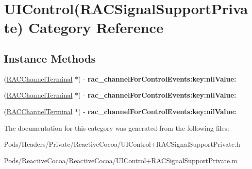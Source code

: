 \hypertarget{category_u_i_control_07_r_a_c_signal_support_private_08}{}\section{U\+I\+Control(R\+A\+C\+Signal\+Support\+Private) Category Reference}
\label{category_u_i_control_07_r_a_c_signal_support_private_08}
\subsection*{Instance Methods}
\begin{DoxyCompactItemize}
\item 
\mbox{\label{category_u_i_control_07_r_a_c_signal_support_private_08_a287d73439f15bf8e484ccc462cccd0b3}} 
(\mbox{\hyperlink{interface_r_a_c_channel_terminal}{R\+A\+C\+Channel\+Terminal}} $\ast$) -\/ {\bfseries rac\+\_\+channel\+For\+Control\+Events\+:key\+:nil\+Value\+:}
\item 
\mbox{\label{category_u_i_control_07_r_a_c_signal_support_private_08_a287d73439f15bf8e484ccc462cccd0b3}} 
(\mbox{\hyperlink{interface_r_a_c_channel_terminal}{R\+A\+C\+Channel\+Terminal}} $\ast$) -\/ {\bfseries rac\+\_\+channel\+For\+Control\+Events\+:key\+:nil\+Value\+:}
\item 
\mbox{\label{category_u_i_control_07_r_a_c_signal_support_private_08_a287d73439f15bf8e484ccc462cccd0b3}} 
(\mbox{\hyperlink{interface_r_a_c_channel_terminal}{R\+A\+C\+Channel\+Terminal}} $\ast$) -\/ {\bfseries rac\+\_\+channel\+For\+Control\+Events\+:key\+:nil\+Value\+:}
\end{DoxyCompactItemize}


The documentation for this category was generated from the following files\+:\begin{DoxyCompactItemize}
\item 
Pods/\+Headers/\+Private/\+Reactive\+Cocoa/U\+I\+Control+\+R\+A\+C\+Signal\+Support\+Private.\+h\item 
Pods/\+Reactive\+Cocoa/\+Reactive\+Cocoa/U\+I\+Control+\+R\+A\+C\+Signal\+Support\+Private.\+m\end{DoxyCompactItemize}
